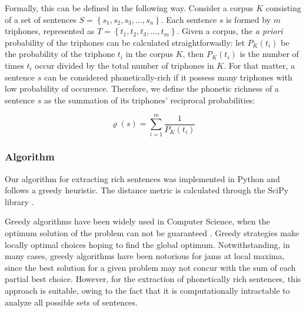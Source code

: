 Formally, this can be defined in the following way. Consider a corpus $K$ consisting of a set of sentences 
$S = \left \{ s_1, s_2, s_3, ..., s_n \right \}$. Each sentence $s$ is formed by $m$ triphones, represented as $T = \left \{ t_1, t_2, t_3, ..., t_m \right \}$. Given a corpus, the \emph{a priori} probability of the triphones can be calculated straightforwadly: let $P_K(t_i)$ be the probability of the triphone $t_i$ in the corpus $K$, then $P_K(t_i)$ is the number of times $t_i$ occur divided by the total number of triphones in $K$. For that matter, a sentence $s$ can be considered phonetically-rich if it possess many triphones with low probability of occurence. Therefore, we define the phonetic richness of a sentence $s$ as the summation of its triphones' reciprocal probabilities:

\begin{equation}
\varrho(s) = \sum_{i=1}^{m} \frac{1}{P_K(t_i)}
\end{equation}


\subsubsection{Algorithm}

Our algorithm for extracting rich sentences was implemented in Python and follows a greedy heuristic. The distance
metric is calculated through the SciPy library \cite{Scipy2014}.

Greedy algorithms have been widely used in Computer Science, when the optimum solution of the problem can 
not be guaranteed \cite{Coppin2010}. Greedy strategies  make locally optimal choices hoping to find the global 
optimum. Notwithstanding, in many cases, greedy algorithms have been notorious for jams at local maxima, since the best solution 
for a given problem may not concur with the sum of each partial best choice. However, for the extraction of
phonetically rich sentences, this approach is suitable, owing to the fact that it is computationally intractable
to analyze all possible sets of sentences.

